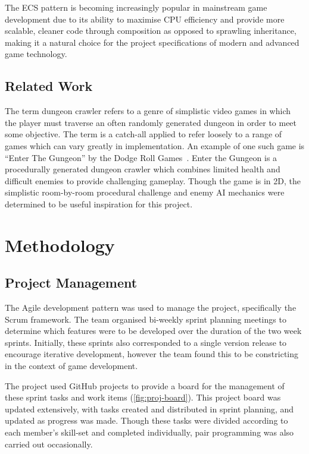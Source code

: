 \documentclass[a4paper, oneside, 11pt]{report}
\begin{document}
The ECS pattern is becoming increasingly popular in mainstream game development due to its ability to maximise CPU efficiency and provide more scalable, cleaner code through composition as opposed to sprawling inheritance, making it a natural choice for the project specifications of modern and advanced game technology.

\section{Related Work}
The term dungeon crawler refers to a genre of simplistic video games in which the player must traverse an often randomly generated dungeon in order to meet some objective. The term is a catch-all applied to refer loosely to a range of games which can vary greatly in implementation. An example of one such game is ``Enter The Gungeon'' by the Dodge Roll Games~\cite{gungeon}. Enter the Gungeon is a procedurally generated dungeon crawler which combines limited health and difficult enemies to provide challenging gameplay. Though the game is in 2D, the simplistic room-by-room procedural challenge and enemy AI mechanics were determined to be useful inspiration for this project. 

\chapter{Methodology}

\section{Project Management}
The Agile development pattern was used to manage the project, specifically the Scrum framework. The team organised bi-weekly sprint planning meetings to determine which features were to be developed over the duration of the two week sprints. Initially, these sprints also corresponded to a single version release to encourage iterative development, however the team found this to be constricting in the context of game development.

The project used GitHub projects to provide a board for the management of these sprint tasks and work items (\ref{fig:proj-board}). This project board was updated extensively, with tasks created and distributed in sprint planning, and updated as progress was made. Though these tasks were divided according to each member's skill-set and completed individually, pair programming was also carried out occasionally. 
\end{document}
